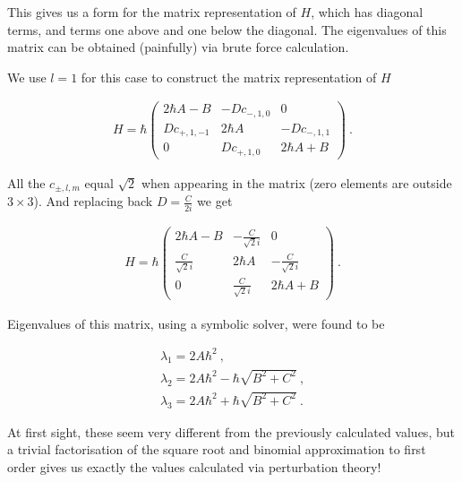 This gives us a form for the matrix representation of $H$, which has diagonal
terms, and terms one above and one below the diagonal. The eigenvalues of this
matrix can be obtained (painfully) via brute force calculation.

We use $l = 1$ for this case to construct the matrix representation of $H$

\begin{align}
    H = \hbar \begin{pmatrix}
        2\hbar A - B    & -Dc_{-, 1,0}       & 0             \\   
        Dc_{+, 1,-1}    & 2\hbar A          & -Dc_{-, 1,1}   \\   
        0               & Dc_{+, 1,0}       & 2\hbar A + B    
    \end{pmatrix}~.
\end{align}

All the $c_{\pm, l,m}$ equal $\sqrt{2}$ when appearing in the matrix (zero
elements are outside $3\times 3$). And replacing back $D = \frac{C}{2i}$ we get

\begin{align}
    H = \hbar \begin{pmatrix}
        2\hbar A - B        & -\frac{C}{\sqrt{2}i}       & 0                     \\   
        \frac{C}{\sqrt{2}i} & 2\hbar A                  & -\frac{C}{\sqrt{2}i}   \\   
        0                   & \frac{C}{\sqrt{2}i}       & 2\hbar A + B    
    \end{pmatrix}~.
\end{align}

Eigenvalues of this matrix, using a symbolic solver, were found to be 

\begin{gather}
    \lambda_1 = 2 A \hbar^2~,\\
    \lambda_2 = 2 A \hbar^2 - \hbar\sqrt{B^2 + C^2}~,\\
    \lambda_3 = 2 A \hbar^2 + \hbar\sqrt{B^2 + C^2}~.
\end{gather}

At first sight, these seem very different from the previously calculated values,
but a trivial factorisation of the square root and binomial approximation to
first order gives us exactly the values calculated via perturbation theory!